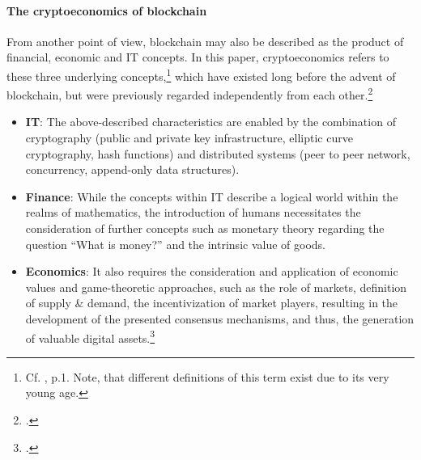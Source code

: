 \paragraph{The cryptoeconomics of blockchain} From another point of view, blockchain may also be described as the product of financial, economic and \ac{IT} concepts. In this paper, cryptoeconomics refers to these three underlying concepts,\footnote{Cf. \cite{BabbittCryptoeconomicDesignProposed2015}, p.1. Note, that different definitions of this term exist due to its very young age.}  which have existed long before the advent of blockchain, but were previously regarded independently from each other.\footcites[Cf.][p.2]{DavidsonEconomicsBlockchain2016}[cf.][p.21]{AntonopolousAndreasM..2017}[cf.][p.110]{RabahDigitalCryptoeconomicsPowered2017}
\begin{itemize}[noitemsep]
    \item \textbf{\ac{IT}}: The above-described characteristics are enabled by the combination of cryptography (public and private key infrastructure, elliptic curve cryptography, hash functions) and distributed systems (peer to peer network, concurrency, append-only data structures).
    \item \textbf{Finance}: While the concepts within \ac{IT} describe a logical world within the realms of mathematics, the introduction of humans necessitates the consideration of further concepts such as monetary theory regarding the question \enquote{What is money?} and the intrinsic value of goods.
    \item \textbf{Economics}: It also requires the consideration and application of economic values and game-theoretic approaches, such as the role of markets, definition of supply \& demand, the incentivization of market players, resulting in the development of the presented consensus mechanisms, and thus, the generation of valuable digital assets.\footcite[Cf.][\textit{Cryptoeconomics}]{BashirMasteringBlockchainSecond2018}
\end{itemize}




